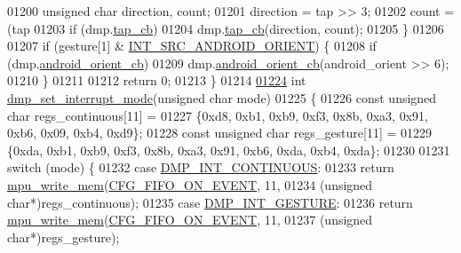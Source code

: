 \begin{DoxyCode}
01200         \textcolor{keywordtype}{unsigned} \textcolor{keywordtype}{char} direction, count;
01201         direction = tap >> 3;
01202         count = (tap %
01203         \textcolor{keywordflow}{if} (dmp.\hyperlink{structdmp__s_a45a59366dd83331a3ae376edeb5b9e94}{tap\_cb})
01204             dmp.\hyperlink{structdmp__s_a45a59366dd83331a3ae376edeb5b9e94}{tap\_cb}(direction, count);
01205     \}
01206 
01207     \textcolor{keywordflow}{if} (gesture[1] & \hyperlink{group___d_r_i_v_e_r_s_ga7c3f4a57d404a1321ce6dfc00e33ac4d}{INT\_SRC\_ANDROID\_ORIENT}) \{
01208         \textcolor{keywordflow}{if} (dmp.\hyperlink{structdmp__s_a4ae9e6ba505d73d0db861f6ca28c1a3a}{android\_orient\_cb})
01209             dmp.\hyperlink{structdmp__s_a4ae9e6ba505d73d0db861f6ca28c1a3a}{android\_orient\_cb}(android\_orient >> 6);
01210     \}
01211 
01212     \textcolor{keywordflow}{return} 0;
01213 \}
01214 
\hypertarget{inv__mpu__dmp__motion__driver_8c_source.tex_l01224}{}\hyperlink{group___d_r_i_v_e_r_s_gaf10c08103d2aec9aa5555a5694bafced}{01224} \textcolor{keywordtype}{int} \hyperlink{group___d_r_i_v_e_r_s_gaf10c08103d2aec9aa5555a5694bafced}{dmp\_set\_interrupt\_mode}(\textcolor{keywordtype}{unsigned} \textcolor{keywordtype}{char} mode)
01225 \{
01226     \textcolor{keyword}{const} \textcolor{keywordtype}{unsigned} \textcolor{keywordtype}{char} regs\_continuous[11] =
01227         \{0xd8, 0xb1, 0xb9, 0xf3, 0x8b, 0xa3, 0x91, 0xb6, 0x09, 0xb4, 0xd9\};
01228     \textcolor{keyword}{const} \textcolor{keywordtype}{unsigned} \textcolor{keywordtype}{char} regs\_gesture[11] =
01229         \{0xda, 0xb1, 0xb9, 0xf3, 0x8b, 0xa3, 0x91, 0xb6, 0xda, 0xb4, 0xda\};
01230 
01231     \textcolor{keywordflow}{switch} (mode) \{
01232     \textcolor{keywordflow}{case} \hyperlink{group___d_r_i_v_e_r_s_gaabccda0e9ccd1a2f4287d23fe4b0c776}{DMP\_INT\_CONTINUOUS}:
01233         \textcolor{keywordflow}{return} \hyperlink{group___d_r_i_v_e_r_s_gafea59910bc3dd30ba3356b1c75213a5f}{mpu\_write\_mem}(\hyperlink{group___d_r_i_v_e_r_s_ga7aa6ed56d6fd41be120b9bdb488c220a}{CFG\_FIFO\_ON\_EVENT}, 11,
01234             (\textcolor{keywordtype}{unsigned} \textcolor{keywordtype}{char}*)regs\_continuous);
01235     \textcolor{keywordflow}{case} \hyperlink{group___d_r_i_v_e_r_s_gaab5d80253aaee2470c95c6981b731255}{DMP\_INT\_GESTURE}:
01236         \textcolor{keywordflow}{return} \hyperlink{group___d_r_i_v_e_r_s_gafea59910bc3dd30ba3356b1c75213a5f}{mpu\_write\_mem}(\hyperlink{group___d_r_i_v_e_r_s_ga7aa6ed56d6fd41be120b9bdb488c220a}{CFG\_FIFO\_ON\_EVENT}, 11,
01237             (\textcolor{keywordtype}{unsigned} \textcolor{keywordtype}{char}*)regs\_gesture);

\end{DoxyCode}

